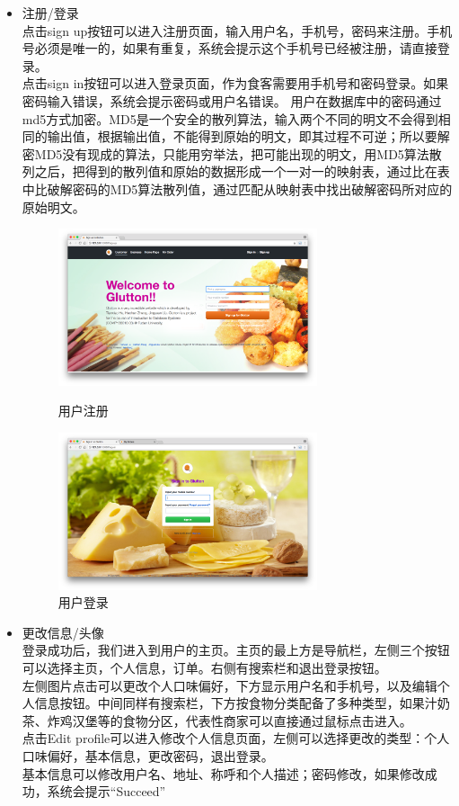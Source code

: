 \documentclass[12pt, oneside,a4paper]{article}
\begin{document}
  \begin{itemize}
  \item 注册/登录\\
  点击sign up按钮可以进入注册页面，输入用户名，手机号，密码来注册。手机号必须是唯一的，如果有重复，系统会提示这个手机号已经被注册，请直接登录。\\
  点击sign in按钮可以进入登录页面，作为食客需要用手机号和密码登录。如果密码输入错误，系统会提示密码或用户名错误。
  用户在数据库中的密码通过md5方式加密。MD5是一个安全的散列算法，输入两个不同的明文不会得到相同的输出值，根据输出值，不能得到原始的明文，即其过程不可逆；所以要解密MD5没有现成的算法，只能用穷举法，把可能出现的明文，用MD5算法散列之后，把得到的散列值和原始的数据形成一个一对一的映射表，通过比在表中比破解密码的MD5算法散列值，通过匹配从映射表中找出破解密码所对应的原始明文。
  \begin{figure}[H]
   \begin{minipage}[t]{0.5\linewidth}
    \centering
     \includegraphics[width=3in]{cu-signup.jpg}
     \caption{\small{用户注册}}
   \end{minipage}
   \begin{minipage}[t]{0.5\linewidth}
    \centering
     \includegraphics[width=3in]{cu-signin.jpg}
      \caption{\small{用户登录}}
   \end{minipage}
   \end{figure}
  \item 更改信息/头像\\
  登录成功后，我们进入到用户的主页。主页的最上方是导航栏，左侧三个按钮可以选择主页，个人信息，订单。右侧有搜索栏和退出登录按钮。\\
  左侧图片点击可以更改个人口味偏好，下方显示用户名和手机号，以及编辑个人信息按钮。中间同样有搜索栏，下方按食物分类配备了多种类型，如果汁奶茶、炸鸡汉堡等的食物分区，代表性商家可以直接通过鼠标点击进入。\\
    点击Edit profile可以进入修改个人信息页面，左侧可以选择更改的类型：个人口味偏好，基本信息，更改密码，退出登录。\\
  基本信息可以修改用户名、地址、称呼和个人描述；密码修改，如果修改成功，系统会提示“Succeed”
 

\end{itemize}
\end{document}
